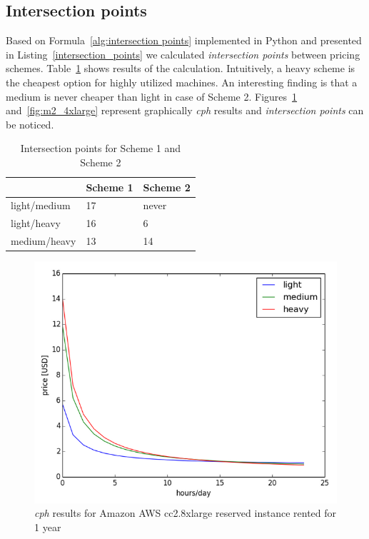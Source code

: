 \documentclass[]{final_report}
\begin{document}
\subsection{Intersection points}

Based on Formula~\ref{alg:intersection points} implemented in Python and presented in Listing~\ref{intersection_points} we calculated \textit{intersection points} between pricing schemes. Table~\ref{tab:intersection_points} shows results of the calculation. Intuitively, a heavy scheme is the cheapest option for highly utilized machines. An interesting finding is that a medium is never cheaper than light in case of Scheme 2. Figures~\ref{fig:cc2_8xlarge} and~\ref{fig:m2_4xlarge} represent graphically \textit{cph} results and \textit{intersection points} can be noticed.

\begin{table}[h]
\begin{center}
    \begin{tabular}{| l | l | l |}
    \hline
    & \textbf{Scheme 1} & \textbf{Scheme 2} \\
    \hline
    light/medium & 17 & never \\
    \hline
    light/heavy & 16 & 6 \\
    \hline
    medium/heavy & 13 & 14 \\
    \hline
    \end{tabular}
\end{center}
\caption{Intersection points for Scheme 1 and Scheme 2}
\label{tab:intersection_points}
\end{table}

\begin{figure}[H]
  \includegraphics[width=\linewidth]{figures/cc2_8xlarge}
  \caption{\textit{cph} results for Amazon AWS cc2.8xlarge reserved instance rented for 1 year~\cite{AWS:light}~\cite{AWS:medium}~\cite{AWS:heavy}}
  \label{fig:cc2_8xlarge}
\end{figure}
\end{document}
